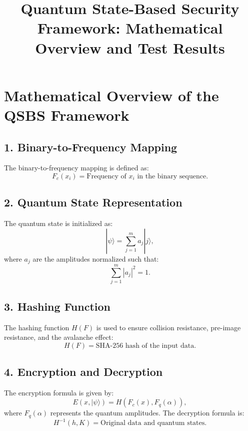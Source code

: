 \documentclass{article}
\begin{document}
\title{Quantum State-Based Security Framework: Mathematical Overview and Test Results}
\author{}
\date{}
\maketitle


\section*{Mathematical Overview of the QSBS Framework}

\subsection*{1. Binary-to-Frequency Mapping}
The binary-to-frequency mapping is defined as:
\begin{equation}
F_c(x_i) = \text{Frequency of } x_i \text{ in the binary sequence.}
\end{equation}

\subsection*{2. Quantum State Representation}
The quantum state is initialized as:
\begin{equation}
|\psi\rangle = \sum_{j=1}^m a_j |j\rangle,
\end{equation}
where $a_j$ are the amplitudes normalized such that:
\begin{equation}
\sum_{j=1}^m |a_j|^2 = 1.
\end{equation}

\subsection*{3. Hashing Function}
The hashing function $H(F)$ is used to ensure collision resistance, pre-image resistance, and the avalanche effect:
\begin{equation}
H(F) = \text{SHA-256 hash of the input data.}
\end{equation}

\subsection*{4. Encryption and Decryption}
The encryption formula is given by:
\begin{equation}
E(x, |\psi\rangle) = H(F_c(x), F_q(\alpha)),
\end{equation}
where $F_q(\alpha)$ represents the quantum amplitudes. The decryption formula is:
\begin{equation}
H^{-1}(h, K) = \text{Original data and quantum states.}
\end{equation}
\end{document}
